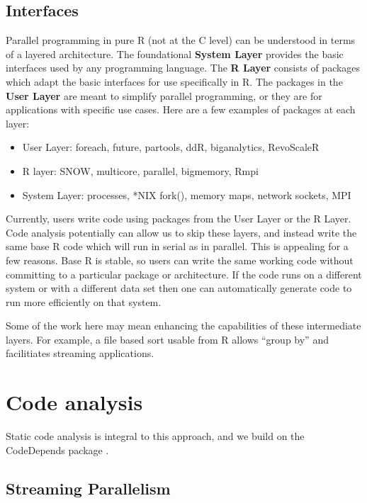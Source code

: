 \documentclass[12pt]{article}
\begin{document}
\subsection{Interfaces}

Parallel programming in pure R (not at the C level) can be understood in
terms of a layered architecture. The foundational \textbf{System Layer}
provides the basic interfaces used by any programming language. The
\textbf{R Layer} consists of packages which adapt the basic interfaces for
use specifically in R. The packages in the \textbf{User Layer} are meant to
simplify parallel programming, or they are for applications with specific
use cases.  Here are a few examples of packages at each layer:

\begin{itemize}
\item User Layer: foreach, future, partools, ddR, biganalytics, RevoScaleR
\item R layer: SNOW, multicore, parallel, bigmemory, Rmpi
\item System Layer: processes, *NIX fork(), memory maps, network sockets,
    MPI
\end{itemize}

Currently, users write code using packages from the User Layer or the R
Layer. Code analysis potentially can allow us to skip these layers, and
instead write the same base R code which will run in serial as in parallel.
This is appealing for a few reasons. Base R is stable, so users can write
the same working code without committing to a particular package or
architecture. If the code runs on a different system or with a different
data set then one can automatically generate code to run more efficiently
on that system.

Some of the work here may mean enhancing the capabilities of these
intermediate layers. For example, a file based sort usable from R allows
``group by'' and facilitiates streaming applications.

\section{Code analysis}

Static code analysis is integral to this approach, and we build on the 
CodeDepends package \cite{R-CodeDepends}.

\subsection{Streaming Parallelism}
\end{document}
